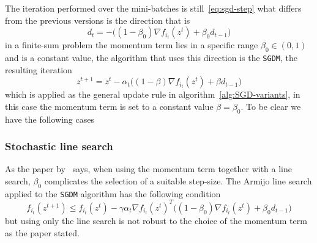 The iteration performed over the mini-batches is still~\eqref{eq:sgd-step} what differs from the previous versions is the direction that is
\[
d_t=-\bigl((1-\beta_0)\nabla f_{i_t}(z^t)+\beta_0d_{t-1}\bigr)
\]
in a finite-sum problem the momentum term lies in a specific range $\beta_0\in(0,1)$ and is a constant value, the algorithm that uses this direction is the \texttt{SGDM}, the resulting iteration
\begin{equation}\label{eq:sgdm-step}
z^{t+1}=z^t-\alpha_t\bigl((1-\beta)\nabla f_{i_t}(z^t)+\beta d_{t-1}\bigr)
\end{equation}
which is applied as the general update rule in algorithm~\ref{alg:SGD-variants}, in this case the momentum term is set to a constant value $\beta=\beta_0$. To be clear we have the following cases
\begin{center}
\end{center}

\subsubsection{Stochastic line search}

As the paper by~\textcite{fan_msl_2023} says, when using the momentum term together with a line search, $\beta_0$ complicates the selection of a suitable step-size. The Armijo line search applied to the \texttt{SGDM} algorithm has the following condition
\begin{equation}\label{eq:armijo-sgdm}
f_{i_t}(z^{t+1})\leq f_{i_t}(z^t)-\gamma\alpha_t\nabla f_{i_t}(z^t)^T\bigl((1-\beta_0)\nabla f_{i_t}(z^t)+\beta_0d_{t-1}\bigr)
\end{equation}
but using only the line search is not robust to the choice of the momentum term as the paper stated.

